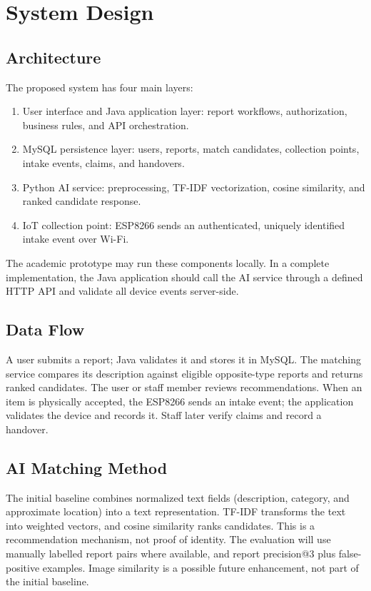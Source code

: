\documentclass[12pt,a4paper]{report}
\begin{document}
\chapter{System Design}
\section{Architecture}
The proposed system has four main layers:
\begin{enumerate}
\item User interface and Java application layer: report workflows, authorization, business rules, and API orchestration.
\item MySQL persistence layer: users, reports, match candidates, collection points, intake events, claims, and handovers.
\item Python AI service: preprocessing, TF-IDF vectorization, cosine similarity, and ranked candidate response.
\item IoT collection point: ESP8266 sends an authenticated, uniquely identified intake event over Wi-Fi.
\end{enumerate}
The academic prototype may run these components locally. In a complete implementation, the Java application should call the AI service through a defined HTTP API and validate all device events server-side.

\section{Data Flow}
A user submits a report; Java validates it and stores it in MySQL. The matching service compares its description against eligible opposite-type reports and returns ranked candidates. The user or staff member reviews recommendations. When an item is physically accepted, the ESP8266 sends an intake event; the application validates the device and records it. Staff later verify claims and record a handover.

\section{AI Matching Method}
The initial baseline combines normalized text fields (description, category, and approximate location) into a text representation. TF-IDF transforms the text into weighted vectors, and cosine similarity ranks candidates. This is a recommendation mechanism, not proof of identity. The evaluation will use manually labelled report pairs where available, and report precision@3 plus false-positive examples. Image similarity is a possible future enhancement, not part of the initial baseline.
\end{document}
